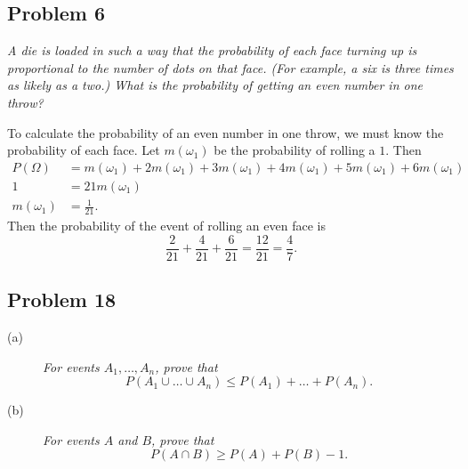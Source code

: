 \documentclass{tufte-handout}
\begin{document}
\subsection{Problem 6}
\begin{description}
\item \textit{A die is loaded in such a way that the probability of
    each face turning up is proportional to the number of dots on that
    face. (For example, a six is three times as likely as a two.) What
    is the probability of getting an even number in one throw?}
\end{description}

To calculate the probability of an even number in one throw, we must
know the probability of each face. Let $m(\omega_1)$ be the probability of
rolling a $1$. Then 
\begin{align*}
  P(\Omega) &= m(\omega_1) + 2m(\omega_1) + 3m(\omega_1) + 4m(\omega_1) +
  5m(\omega_1) + 6m(\omega_1)\\
  1 &= 21m(\omega_1)\\
  m(\omega_1) &= \frac{1}{21}.
\end{align*}
Then the probability of the event of rolling an even face is
\[\frac{2}{21} + \frac{4}{21} + \frac{6}{21} = \frac{12}{21} =
\frac{4}{7}.\]

\subsection{Problem 18}
\begin{description}
\item[(a)] \textit{For events $A_1,\dots, A_n$, prove that
  \[
  P(A_1 \cup \dots \cup A_n) \leq P(A_1) + \dots + P(A_n).
  \]}
\item[(b)] \textit{For events $A$ and $B$, prove that
  \[
  P(A \cap B) \geq P(A) + P(B) - 1.
  \]}
\end{description}
\end{document}
